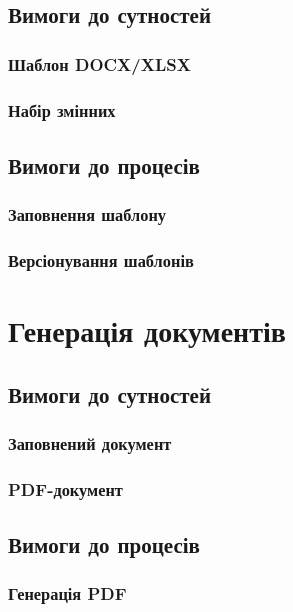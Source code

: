 \subsection{Вимоги до сутностей}

\subsubsection{Шаблон DOCX/XLSX}

\subsubsection{Набір змінних}

\subsection{Вимоги до процесів}

\subsubsection{Заповнення шаблону}

\subsubsection{Версіонування шаблонів}

\newpage
\section{Генерація документів}

\subsection{Вимоги до сутностей}

\subsubsection{Заповнений документ}

\subsubsection{PDF-документ}

\subsection{Вимоги до процесів}

\subsubsection{Генерація PDF}

